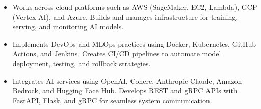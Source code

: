 \begin{itemize}
  \item Works across cloud platforms such as AWS (SageMaker, EC2, Lambda), GCP (Vertex AI), and
        Azure. Builds and manages infrastructure for training, serving, and monitoring AI models.

  \item Implements DevOps and MLOps practices using Docker, Kubernetes, GitHub Actions, and Jenkins.
        Creates CI/CD pipelines to automate model deployment, testing, and rollback strategies.

  \item Integrates AI services using OpenAI, Cohere, Anthropic Claude, Amazon Bedrock, and Hugging
        Face Hub. Develops REST and gRPC APIs with FastAPI, Flask, and gRPC for seamless system
        communication.
\end{itemize}
